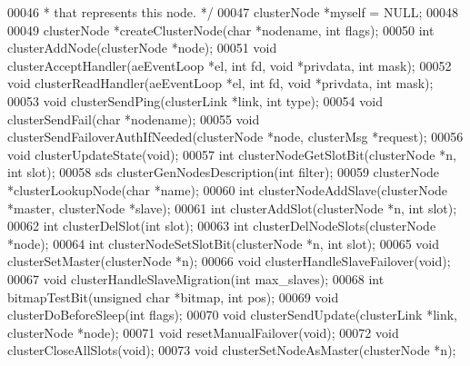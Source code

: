 \begin{DoxyCode}
00046 \textcolor{comment}{ * that represents this node. */}
00047 clusterNode *myself = NULL;
00048 
00049 clusterNode *createClusterNode(\textcolor{keywordtype}{char} *nodename, \textcolor{keywordtype}{int} flags);
00050 \textcolor{keywordtype}{int} clusterAddNode(clusterNode *node);
00051 \textcolor{keywordtype}{void} clusterAcceptHandler(aeEventLoop *el, \textcolor{keywordtype}{int} fd, \textcolor{keywordtype}{void} *privdata, \textcolor{keywordtype}{int} mask);
00052 \textcolor{keywordtype}{void} clusterReadHandler(aeEventLoop *el, \textcolor{keywordtype}{int} fd, \textcolor{keywordtype}{void} *privdata, \textcolor{keywordtype}{int} mask);
00053 \textcolor{keywordtype}{void} clusterSendPing(clusterLink *link, \textcolor{keywordtype}{int} type);
00054 \textcolor{keywordtype}{void} clusterSendFail(\textcolor{keywordtype}{char} *nodename);
00055 \textcolor{keywordtype}{void} clusterSendFailoverAuthIfNeeded(clusterNode *node, clusterMsg *request);
00056 \textcolor{keywordtype}{void} clusterUpdateState(\textcolor{keywordtype}{void});
00057 \textcolor{keywordtype}{int} clusterNodeGetSlotBit(clusterNode *n, \textcolor{keywordtype}{int} slot);
00058 sds clusterGenNodesDescription(\textcolor{keywordtype}{int} filter);
00059 clusterNode *clusterLookupNode(\textcolor{keywordtype}{char} *name);
00060 \textcolor{keywordtype}{int} clusterNodeAddSlave(clusterNode *master, clusterNode *slave);
00061 \textcolor{keywordtype}{int} clusterAddSlot(clusterNode *n, \textcolor{keywordtype}{int} slot);
00062 \textcolor{keywordtype}{int} clusterDelSlot(\textcolor{keywordtype}{int} slot);
00063 \textcolor{keywordtype}{int} clusterDelNodeSlots(clusterNode *node);
00064 \textcolor{keywordtype}{int} clusterNodeSetSlotBit(clusterNode *n, \textcolor{keywordtype}{int} slot);
00065 \textcolor{keywordtype}{void} clusterSetMaster(clusterNode *n);
00066 \textcolor{keywordtype}{void} clusterHandleSlaveFailover(\textcolor{keywordtype}{void});
00067 \textcolor{keywordtype}{void} clusterHandleSlaveMigration(\textcolor{keywordtype}{int} max\_slaves);
00068 \textcolor{keywordtype}{int} bitmapTestBit(\textcolor{keywordtype}{unsigned} \textcolor{keywordtype}{char} *bitmap, \textcolor{keywordtype}{int} pos);
00069 \textcolor{keywordtype}{void} clusterDoBeforeSleep(\textcolor{keywordtype}{int} flags);
00070 \textcolor{keywordtype}{void} clusterSendUpdate(clusterLink *link, clusterNode *node);
00071 \textcolor{keywordtype}{void} resetManualFailover(\textcolor{keywordtype}{void});
00072 \textcolor{keywordtype}{void} clusterCloseAllSlots(\textcolor{keywordtype}{void});
00073 \textcolor{keywordtype}{void} clusterSetNodeAsMaster(clusterNode *n);

\end{DoxyCode}
